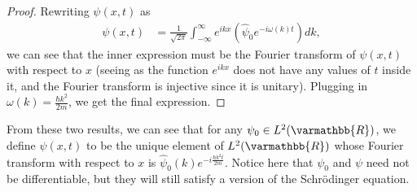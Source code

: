 \documentclass[12pt]{extarticle}
\newcommand{\R}{\varmathbb{R}}
\theoremstyle{plain}
\theoremstyle{definition}
\theoremstyle{remark}
\begin{document}
  \begin{proof}
    Rewriting $\psi(x,t)$ as
    \begin{align*}
      \psi(x,t) &= \frac{1}{\sqrt{2\pi}}\int_{-\infty}^{\infty}e^{ikx}\left(\hat{\psi}_0e^{-i\omega(k)t}\right)dk,
    \end{align*}
    we can see that the inner expression must be the Fourier transform of $\psi(x,t)$ with respect to $x$ (seeing as the function $e^{ikx}$ does not have any values of $t$ inside it, and the Fourier transform is injective since it is unitary). Plugging in $\omega(k) = \frac{\hbar k^2}{2m}$, we get the final expression.
  \end{proof}
  From these two results, we can see that for any $\psi_0 \in L^{2}(\R)$, we define $\psi(x,t)$ to be the unique element of $L^{2}(\R)$ whose Fourier transform with respect to $x$ is $\hat{\psi}_0(k)e^{-i\frac{\hbar k^2 t}{2m}}$. Notice here that $\psi_0$ and $\psi$ need not be differentiable, but they will still satisfy a version of the Schrödinger equation.
\end{document}
